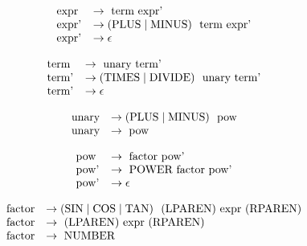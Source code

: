 \documentclass[fleqn]{article}
\begin{document}
\begin{center}
\[
\begin{array}{@{}l l@{}}
\text{expr }   &\rightarrow \text{ term expr'} \\
\text{expr'}   &\rightarrow (\text{PLUS} \mid \text{MINUS})\ \text{ term expr'} \\
\text{expr'}   &\rightarrow \epsilon
\end{array}
\]

\[
\begin{array}{@{}l l@{}}
\text{term }   &\rightarrow \text{ unary term'} \\
\text{term'}   &\rightarrow (\text{TIMES} \mid \text{DIVIDE})\ \text{ unary term'} \\
\text{term'}   &\rightarrow \epsilon
\end{array}
\]

\[
\begin{array}{@{}l l@{}}
\text{unary}   &\rightarrow (\text{PLUS} \mid \text{MINUS})\ \text{ pow} \\
\text{unary}   &\rightarrow \text{ pow}
\end{array}
\]

\[
\begin{array}{@{}l l@{}}
\text{pow }    &\rightarrow \text{ factor pow'} \\
\text{pow'}    &\rightarrow \text{ POWER factor pow'} \\
\text{pow'}    &\rightarrow \epsilon
\end{array}
\]

\[
\begin{array}{@{}l l@{}}
\text{factor} &\rightarrow (\text{SIN} \mid \text{COS} \mid \text{TAN})\ \text{ (LPAREN) expr (RPAREN)} \\
\text{factor}  &\rightarrow \text{ (LPAREN) expr (RPAREN)} \\
\text{factor}  &\rightarrow \text{ NUMBER}
\end{array}
\]

\end{center}
\end{document}
